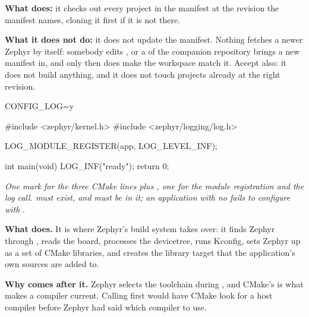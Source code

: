 \textbf{What  does:} it checks out every project in the manifest at the revision
the manifest names, cloning it first if it is not there. 

\textbf{What it does not do:} it does not update the manifest. Nothing fetches a newer Zephyr by
itself: somebody edits , or a  of the companion repository brings a
new manifest in, and only then does  make the workspace match it. Accept also:
it does not build anything, and it does not touch projects already at the right revision. 



\begin{kconfigcode}
CONFIG_LOG=y
\end{kconfigcode}

\begin{ccode}
#include <zephyr/kernel.h>
#include <zephyr/logging/log.h>

LOG_MODULE_REGISTER(app, LOG_LEVEL_INF);

int main(void)
{
	LOG_INF("ready");
	return 0;
}
\end{ccode}

\noindent{}

\noindent\emph{One mark for the three CMake lines plus , one for the module
registration and the log call.  must exist, and  must be in it;
an application with no  fails to configure with}
.

\textbf{What  does.} It is where Zephyr's build system takes over: it
finds Zephyr through , reads the board, processes the devicetree, runs Kconfig,
sets Zephyr up as a set of CMake libraries, and creates the library target  that the
application's own sources are added to. 

\textbf{Why  comes after it.} Zephyr selects the toolchain during
, and CMake's  is what makes a compiler current. Calling
 first would have CMake look for a host compiler before Zephyr had said which
compiler to use. 

